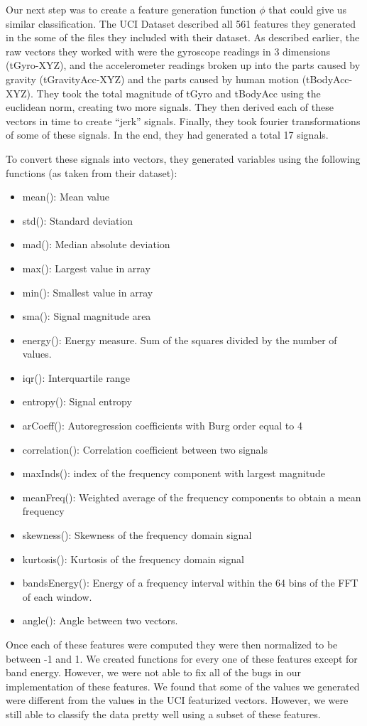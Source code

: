 \documentclass{article} %
\begin{document}
Our next step was to create a feature generation function $\phi$ that could give us similar classification. The UCI Dataset described all 561 features they generated in the some of the files they included with their dataset. As described earlier, the raw vectors they worked with were the gyroscope readings in 3 dimensions (tGyro-XYZ), and the accelerometer readings broken up into the parts caused by gravity (tGravityAcc-XYZ) and the parts caused by human motion (tBodyAcc-XYZ). They took the total magnitude of tGyro and tBodyAcc using the euclidean norm, creating two more signals. They then derived each of these vectors in time to create “jerk” signals. Finally, they took fourier transformations of some of these signals. In the end, they had generated a total 17 signals.

To convert these signals into vectors, they generated variables using the following functions (as taken from their dataset):
\begin{itemize}
\item mean(): Mean value
\item std(): Standard deviation
\item mad(): Median absolute deviation 
\item max(): Largest value in array
\item min(): Smallest value in array
\item sma(): Signal magnitude area
\item energy(): Energy measure. Sum of the squares divided by the number of values. 
\item iqr(): Interquartile range 
\item entropy(): Signal entropy
\item arCoeff(): Autoregression coefficients with Burg order equal to 4
\item correlation(): Correlation coefficient between two signals
\item maxInds(): index of the frequency component with largest magnitude
\item meanFreq(): Weighted average of the frequency components to obtain a mean frequency
\item skewness(): Skewness of the frequency domain signal 
\item kurtosis(): Kurtosis of the frequency domain signal 
\item bandsEnergy(): Energy of a frequency interval within the 64 bins of the FFT of each window.
\item angle(): Angle between two vectors.
\end{itemize}
Once each of these features were computed they were then normalized to be between -1 and 1. We created functions for every one of these features except for band energy. However, we were not able to fix all of the bugs in our implementation of these features. We found that some of the values we generated were different from the values in the UCI featurized vectors. However, we were still able to classify the data pretty well using a subset of these features. 
\end{document}
